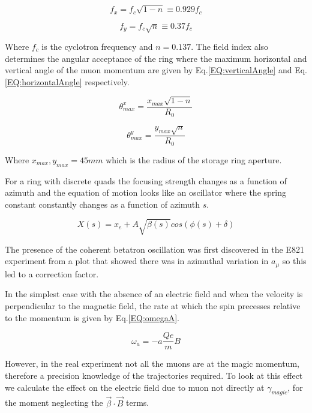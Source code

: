 \documentclass[./Thesis]{subfiles}
\begin{document}
	\begin{equation}
	\label{EQ:verticalFreq}
	f_x = f_c \sqrt{1-n} \equiv 0.929 f_c
	\end{equation}
	
	\begin{equation}
	\label{EQ:horizontalFreq}
	f_y = f_c \sqrt{n} \equiv 0.37f_c
	\end{equation}

Where $f_c$ is the cyclotron frequency and $n=0.137$. The field index also determines the angular acceptance of the ring where the maximum horizontal and vertical angle of the muon momentum are given by Eq.\ref{EQ:verticalAngle} and Eq.\ref{EQ:horizontalAngle} respectively.

	\begin{equation}
	\label{EQ:verticalAngle}
	\theta^{x}_{max} = \frac{x_{max} \sqrt{1-n}}{R_0}
	\end{equation}

	\begin{equation}
	\label{EQ:horizontalAngle}
	\theta^{y}_{max} = \frac{y_{max} \sqrt{n}}{R_0}
	\end{equation}

Where $x_{max} ,y_{max} =  45mm$ which is the radius of the storage ring aperture.

For a ring with discrete quads the focusing strength changes as a function of azimuth and the equation of motion looks like an oscillator where the spring constant constantly changes as a function of azimuth $s$. 

	\begin{equation}
	X(s) = x_e + A \sqrt{\beta(s)} cos(\phi(s)+\delta)
	\end{equation}
	
The presence of the coherent betatron oscillation was first discovered in the E821 experiment from a plot that showed there was in azimuthal variation in $a_\mu$ so this led to a correction factor.

In the simplest case with the absence of an electric field and when the velocity is perpendicular to the magnetic field, the rate at which the spin precesses relative to the momentum is given by Eq.\ref{EQ:omegaA}.
	
	\begin{equation}
	\label{EQ:omegaA}
	\omega_{a} = -a\frac{Qe}{m} B
	\end{equation}

However, in the real experiment not all the muons are at the magic momentum, therefore a precision knowledge of the trajectories required.  To look at this effect we calculate the effect on the electric field due to muon not directly at $\gamma_{magic}$, for the moment neglecting the $\vec{\beta}\cdot\vec{B}$ terms.
\end{document}
